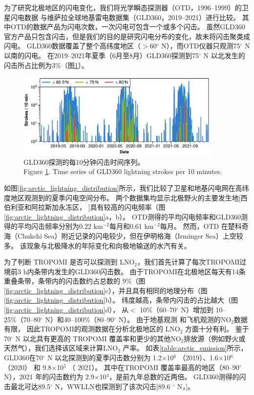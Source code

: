 为了研究北极地区的闪电变化，我们将光学瞬态探测器（OTD，1996--1999）的卫星闪电数据
与维萨拉全球地基雷电数据集（GLD360，2019--2021）进行比较。
其中OTD的数据产品为闪电次数，一次闪电可包含一个或多个闪击。
虽然GLD360官方产品只包含闪击，但是我们的目的是研究闪电分布的变化，故未将闪击聚类成闪电。
GLD360数据覆盖了整个高纬度地区（$>$60$^{\circ}$ N），而OTD仪器只观测75$^{\circ}$ N以南的闪电。
在2019--2021年夏季（6月至8月）GLD360探测到75$^{\circ}$ N 以北发生的闪击所占比例为3\%（图\ref{fig:gld360_tseries}）。

\begin{figure}[H]
\centering
\includegraphics[width=0.9\textwidth]{./figures/arctic_gld360_tseries.png}
\caption{
GLD360探测的每10分钟闪击时间序列。\\
Figure \ref{fig:gld360_tseries}. Time series of GLD360 lightning strokes per 10 minutes.
}
\label{fig:gld360_tseries}
\end{figure}


如图\ref{fig:arctic_lightning_distribution}所示，我们比较了卫星和地基闪电网在高纬度地区观测到的夏季闪电空间分布。
两个数据集均显示北极野火的主要发生地[西伯利亚和阿拉斯加永冻区，
\citep{McCarty.2021}]具有较高的闪电频率（图\ref{fig:arctic_lightning_distribution}a，b）。
OTD测得的平均闪电频率和GLD360测得的平均闪击频率分别为0.22 km$^{-2}$每月和0.61 km$^{-2}$每月。
然而，OTD 在楚科奇海（Chukchi Sea）附近记录的闪电较少，但在伊明格海（Irminger Sea）上空较多。
该现象与北极降水的年际变化和向极地输送的水汽有关\citep{Bintanja.2020}。

为了判断 TROPOMI 是否可以探测到 LNO$_2$，我们首先计算了每次TROPOMI过境前3 h内条带内发生的GLD360闪击数。
由于TROPOMI在北极地区每天有14条重叠条带，条带内的闪击数约占总数的 9\%（图\ref{fig:arctic_lightning_distribution}c），并且具有相同的地理分布（图\ref{fig:arctic_lightning_distribution}b）。
纬度越高，条带内闪击的占比越大（图\ref{fig:arctic_lightning_distribution}d），
从$<$ 10\%（60--70$^{\circ}$ N）增加到 10--25\%（70--80$^{\circ}$ N）和40--100\%（80--90$^{\circ}$ N）。
由于地基观测\citep{Schmale.2018} 和飞机观测\citep{Jacob.2010}的NO$_2$数据有限，
因此TROPOMI的观测数据在分析北极地区的 LNO$_2$ 方面十分有利。
鉴于 70$^{\circ}$ N 以北具有更高的 TROPOMI 覆盖率和更少的其他NO$_2$排放源（例如野火或天然气），我们选择该区域来计算LNO$_2$ 产率。
如表\ref{table:arctic_emission}所示，GLD360在70$^{\circ}$ N 以北探测到的夏季闪击数分别为 1.2$\times$10$^6$ （2019）、1.6$\times$10$^6$ （2020） 和 9.8$\times$10$^5$ （ 2021）。
其中在TROPOMI 覆盖率最高的地区（80--90$^{\circ}$ N），2021 年的闪击数约为 2.9$\times$10$^4$，是前九年总数的近两倍\citep{networktotal.2021}。
GLD360测得的闪击最北可达89.5$^{\circ}$ N，WWLLN也探测到了该次闪击[89.6 $^{\circ}$ N，\citet{Holzworth.2021}]。


